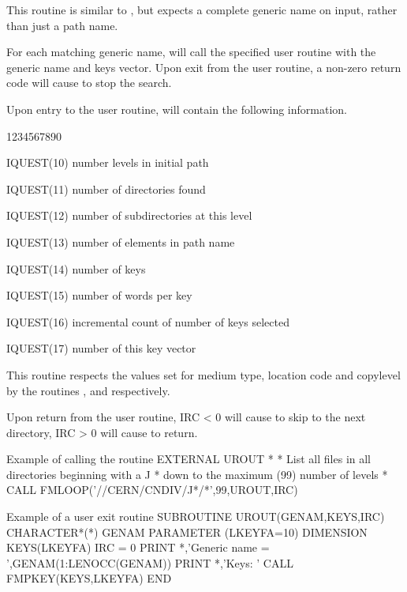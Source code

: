This routine is similar to , but expects a complete generic name
on input, rather than just a path name.

For each matching generic name,  will call the 
specified user routine with the generic name and keys vector.
Upon exit from the user routine, a non-zero
return code will cause  to stop the search.

Upon entry to the user routine,  will contain the following
information.

\begin{DLtt}{1234567890}
\item[IQUEST(10)]number levels in initial path
\item[IQUEST(11)]number of directories found
\item[IQUEST(12)]number of subdirectories at this level
\item[IQUEST(13)]number of elements in path name
\item[IQUEST(14)]number of keys
\item[IQUEST(15)]number of words per key
\item[IQUEST(16)]incremental count of number of keys selected
\item[IQUEST(17)]number of this key vector
\end{DLtt}

This routine respects the values set for medium type, location code
and copylevel by the routines ,  and  respectively.

Upon return from the user routine, IRC < 0 will cause  to skip
to the next directory, IRC > 0 will cause  to return. 
\begin{XMPt}{Example of calling the routine \protect{}}
      EXTERNAL      UROUT
*
*     List all files in all directories beginning with a J
*     down to the maximum (99) number of levels 
*
      CALL FMLOOP('//CERN/CNDIV/J*/*',99,UROUT,IRC)
\end{XMPt}
\begin{XMPt}{Example of a user exit routine}
      SUBROUTINE UROUT(GENAM,KEYS,IRC)
      CHARACTER*(*) GENAM 
      PARAMETER     (LKEYFA=10)
      DIMENSION     KEYS(LKEYFA)
      IRC = 0
      PRINT *,'Generic name = ',GENAM(1:LENOCC(GENAM))
      PRINT *,'Keys: '
      CALL FMPKEY(KEYS,LKEYFA)
      END
\end{XMPt}


